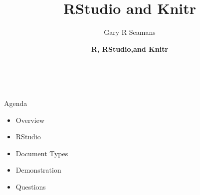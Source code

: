 \documentclass{beamer}
\title{RStudio and Knitr}
\date{\bfseries R, RStudio,and Knitr \normalfont \\
	}
\author{Gary R Seamans}
\begin{document}
\begin{frame}
\titlepage
	\begin{figure}
		\centering
		\\
	\end{figure}
\end{frame}

\begin{frame}{
\begin{minipage}[t]{0.75\textwidth}
	Agenda
\end{minipage}
\hfill
\begin{minipage}[t]{0.25\textwidth}
	\flushright
\end{minipage}
}{}
\begin{center}
	\begin{itemize}
		\item Overview
		\item RStudio
		\item Document Types
		\item Demonstration
		\item Questions
	\end{itemize}
\end{center}
\end{frame}
\end{document}
